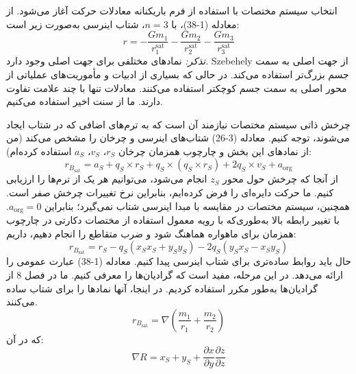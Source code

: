 انتخاب سیستم مختصات با استفاده از فرم باریکنانه معادلات حرکت آغاز می‌شود. از معادله (1-38)، با $n = 3$، شتاب اینرسی به‌صورت زیر است:
\[
r = -\frac{Gm_1}{r_1^{\text{sat}}} - \frac{Gm_2}{r_2^{\text{sat}}} - \frac{Gm_3}{r_3^{\text{sat}}}
\]
\textit{تذکر:} نمادهای مختلفی برای جهت اصلی وجود دارد. Szebehely از جهت اصلی به سمت جسم بزرگ‌تر استفاده می‌کند. در حالی که بسیاری از ادبیات و مأموریت‌های عملیاتی از محور اصلی به سمت جسم کوچکتر استفاده می‌کنند. معادلات تنها با چند علامت تفاوت دارند. ما از سنت اخیر استفاده می‌کنیم.

چرخش ذاتی سیستم مختصات نیازمند آن است که به ترم‌های اضافی که در شتاب ایجاد می‌شوند، توجه کنیم. معادله (3-26) شتاب‌های اینرسی و چرخان را مشخص می‌کند (من از نمادهای این بخش و چارچوب همزمان چرخان $r_S$، $v_S$، $a_S$ استفاده کرده‌ام):
\[
r_{B_{\text{sat}}} = a_S + q_S \times r_S + q_S \times (q_S \times r_S) + 2q_S \times v_S + a_{\text{org}}
\]
از آنجا که چرخش حول محور $z_S$ انجام می‌شود، می‌توانیم هر یک از ترم‌ها را ارزیابی کنیم. ما حرکت دایره‌ای را فرض کرده‌ایم، بنابراین نرخ تغییرات چرخش صفر است. همچنین، سیستم مختصات در مقایسه با مبدا اینرسی شتاب نمی‌گیرد؛ بنابراین $a_{\text{org}} = 0$. با تغییر رابطه بالا به‌طوری‌که با رویه معمول استفاده از مختصات دکارتی در چارچوب همزمان برای ماهواره هماهنگ شود و ضرب متقاطع را انجام دهیم، داریم:
\[
r_{B_{\text{sat}}} = r_S - q_S (x_S x_S + y_S y_S) - 2q_S (y_S x_S - x_S y_S)
\]
حال باید روابط ساده‌تری برای شتاب اینرسی پیدا کنیم. معادله (1-38) عبارت عمومی را ارائه می‌دهد. در این مرحله، مفید است که گرادیان‌ها را معرفی کنیم. ما در فصل 8 از گرادیان‌ها به‌طور مکرر استفاده کردیم. در اینجا، آنها نمادها را برای شتاب ساده می‌کنند.
\[
r_{B_{\text{sat}}} = \nabla \left( \frac{m_1}{r_1} + \frac{m_2}{r_2} \right)
\]
که در آن:
\[
\nabla R = x_S + y_S + \frac{\partial x}{\partial y} \frac{\partial z}{\partial z}
\]

